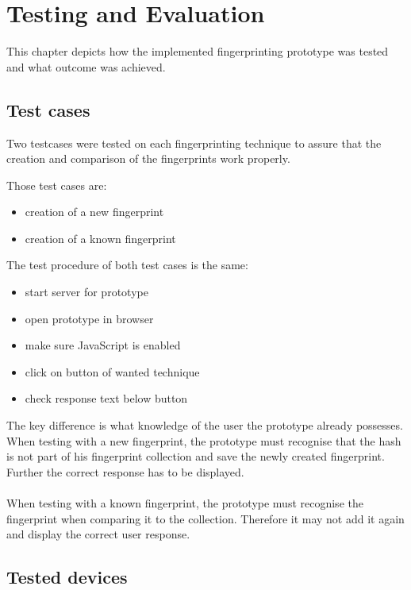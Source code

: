 \chapter{Testing and Evaluation}
\label{cha:evaluation}

This chapter depicts how the implemented fingerprinting prototype was tested and what outcome was achieved.

\section{Test cases}\label{sec:testCases}
Two testcases were tested on each fingerprinting technique to assure that the creation and comparison of the fingerprints work properly.

Those test cases are:
\begin{itemize}
	\item creation of a new fingerprint
	\item creation of a known fingerprint\\
\end{itemize}

The test procedure of both test cases is the same:
\begin{itemize}
	\item start server for prototype
	\item open prototype in browser
	\item make sure JavaScript is enabled
	\item click on button of wanted technique
	\item check response text below button\\
\end{itemize}
The key difference is what knowledge of the user the prototype already possesses. When testing with a new fingerprint, the prototype must recognise that the hash is not part of his fingerprint collection and save the newly created fingerprint. Further the correct response has to be displayed.\\\\
When testing with a known fingerprint, the prototype must recognise the fingerprint when comparing it to the collection. Therefore it may not add it again and display the correct user response.

\section{Tested devices}\label{sec:testdevices}

